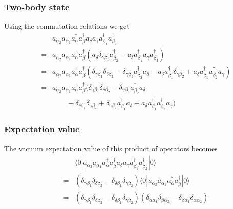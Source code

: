 \documentclass{beamer}
\begin{document}
\begin{frame}
\frametitle{Two-body state}

Using the commutation relations we get 
\begin{align}
	&& a_{\alpha_2} a_{\alpha_1}a^{\dagger}_\alpha a^{\dagger}_\beta 
		a_\delta a_\gamma a_{\beta_1}^{\dagger} a_{\beta_2}^{\dagger} \nonumber \\
	&=& a_{\alpha_2} a_{\alpha_1}a^{\dagger}_\alpha a^{\dagger}_\beta 
		( a_\delta \delta_{\gamma \beta_1} a_{\beta_2}^{\dagger} - 
		a_\delta  a_{\beta_1}^{\dagger} a_\gamma a_{\beta_2}^{\dagger} ) \nonumber \\
	&=& a_{\alpha_2} a_{\alpha_1}a^{\dagger}_\alpha a^{\dagger}_\beta 
		(\delta_{\gamma \beta_1} \delta_{\delta \beta_2} - \delta_{\gamma \beta_1} a_{\beta_2}^{\dagger} a_\delta -
		a_\delta a_{\beta_1}^{\dagger}\delta_{\gamma \beta_2} +
		a_\delta a_{\beta_1}^{\dagger} a_{\beta_2}^{\dagger} a_\gamma ) \nonumber \\
	&=& a_{\alpha_2} a_{\alpha_1}a^{\dagger}_\alpha a^{\dagger}_\beta 
		(\delta_{\gamma \beta_1} \delta_{\delta \beta_2} - \delta_{\gamma \beta_1} a_{\beta_2}^{\dagger} a_\delta \nonumber \\
		&& \qquad - \delta_{\delta \beta_1} \delta_{\gamma \beta_2} + \delta_{\gamma \beta_2} a_{\beta_1}^{\dagger} a_\delta
		+ a_\delta a_{\beta_1}^{\dagger} a_{\beta_2}^{\dagger} a_\gamma ) \label{eq:2-41}
\end{align}
\end{frame}

\begin{frame}
\frametitle{Expectation value}

The vacuum expectation value of this product of operators becomes
\begin{align}
	&& \langle 0|a_{\alpha_2} a_{\alpha_1} a^{\dagger}_\alpha a^{\dagger}_\beta a_\delta a_\gamma 
		a_{\beta_1}^{\dagger} a_{\beta_2}^{\dagger}|0\rangle \nonumber \\
	&=& (\delta_{\gamma \beta_1} \delta_{\delta \beta_2} -
		\delta_{\delta \beta_1} \delta_{\gamma \beta_2} ) 
		\langle 0|a_{\alpha_2} a_{\alpha_1}a^{\dagger}_\alpha a^{\dagger}_\beta|0\rangle \nonumber \\
	&=& (\delta_{\gamma \beta_1} \delta_{\delta \beta_2} -\delta_{\delta \beta_1} \delta_{\gamma \beta_2} )
	(\delta_{\alpha \alpha_1} \delta_{\beta \alpha_2} -\delta_{\beta \alpha_1} \delta_{\alpha \alpha_2} ) \label{eq:2-42b}
\end{align}
\end{frame}
\end{document}
